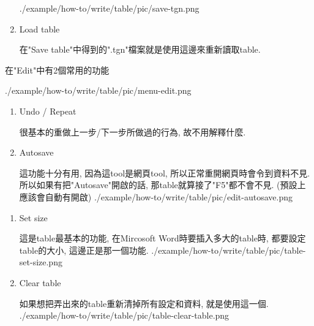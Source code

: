 \begin{enumerate}
{    \InsertCenterImage
      {./example/how-to/write/table/pic/save-tgn.png}

  } %

  \item
  {
    Load table

    在"Save table"中得到的".tgn"檔案就是使用這邊來重新讀取table.
  } %
  \end{enumerate}

\newpage
{}

  在"Edit"中有2個常用的功能

  \InsertCenterImage
    {./example/how-to/write/table/pic/menu-edit.png}

  \begin{enumerate}

  \item
  {
    Undo / Repeat

    很基本的重做上一步/下一步所做過的行為, 故不用解釋什麼.
  } %

  \item
  {
    Autosave

    這功能十分有用, 因為這tool是網頁tool, 所以正常重開網頁時會令到資料不見. 所以如果有把"Autosave"開啟的話, 那table就算接了"F5"都不會不見. (預設上應該會自動有開啟)
    \InsertCenterImage
      {./example/how-to/write/table/pic/edit-autosave.png}
  } %

  \end{enumerate}

\newpage
{}

  \begin{enumerate}

  \item
  {
    Set size

    這是table最基本的功能, 在Mircosoft Word時要插入多大的table時, 都要設定table的大小, 這邊正是那一個功能.
    \InsertCenterImage
      {./example/how-to/write/table/pic/table-set-size.png}
  } %

  \item
  {
    Clear table

    如果想把弄出來的table重新清掉所有設定和資料, 就是使用這一個.
    \InsertCenterImage
      {./example/how-to/write/table/pic/table-clear-table.png}
  } %

  \end{enumerate}

